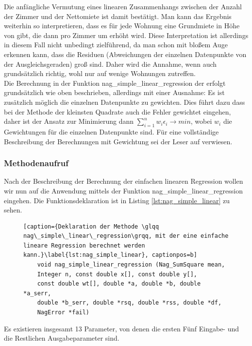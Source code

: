 Die anfängliche Vermutung eines linearen Zusammenhangs zwischen der Anzahl der Zimmer und der Nettomiete ist damit bestätigt.
Man kann das Ergebnis weiterhin so interpretieren, dass es für jede Wohnung eine Grundmiete in Höhe von  gibt, die dann pro Zimmer um  erhöht wird.
Diese Interpretation ist allerdings in diesem Fall nicht unbedingt zielführend, da man schon mit bloßem Auge erkennen kann, dass die Residuen (Abweichungen der einzelnen Datenpunkte von der Ausgleichsgeraden) groß sind.
Daher wird die Annahme, wenn auch grundsätzlich richtig, wohl nur auf wenige Wohnungen zutreffen.
\\

Die Berechnung in der Funktion nag\_simple\_linear\_regression der \naglib erfolgt grundsätzlich wie oben beschrieben, allerdings mit einer Ausnahme: Es ist zusätzlich möglich die einzelnen Datenpunkte zu gewichten.
Dies führt dazu dass bei der Methode der kleinsten Quadrate auch die Fehler gewichtet eingehen, daher ist der Ansatz zur Minimierung dann $\sum\limits_{i=1}^{n}w_i\epsilon_i \rightarrow min$, wobei $w_i$ die Gewichtungen für die einzelnen Datenpunkte sind.
Für eine vollständige Beschreibung der Berechnungen mit Gewichtung sei der Leser auf \cite{nag:g02cac} verwiesen.

\subsubsection{Methodenaufruf}
\label{sec:sim_reg_anwendung}

Nach der Beschreibung der Berechnung der einfachen linearen Regression wollen wir nun auf die Anwendung mittels der Funktion nag\_simple\_linear\_regression eingehen.
Die Funktionsdeklaration ist in Listing \ref{lst:nag_simple_linear} zu sehen.
\begin{figure}[t]
  \begin{lstlisting}[caption={Deklaration der Methode \glqq nag\_simple\_linear\_regression\grqq, mit der eine einfache lineare Regression berechnet werden kann.}\label{lst:nag_simple_linear}, captionpos=b]
    void nag_simple_linear_regression (Nag_SumSquare mean, 
    Integer n, const double x[], const double y[], 
    const double wt[], double *a, double *b, double *a_serr, 
    double *b_serr, double *rsq, double *rss, double *df,
    NagError *fail)
  \end{lstlisting} 
\end{figure}
Es existieren insgesamt 13 Parameter, von denen die ersten Fünf Eingabe- und die Restlichen Ausgabeparameter sind.

